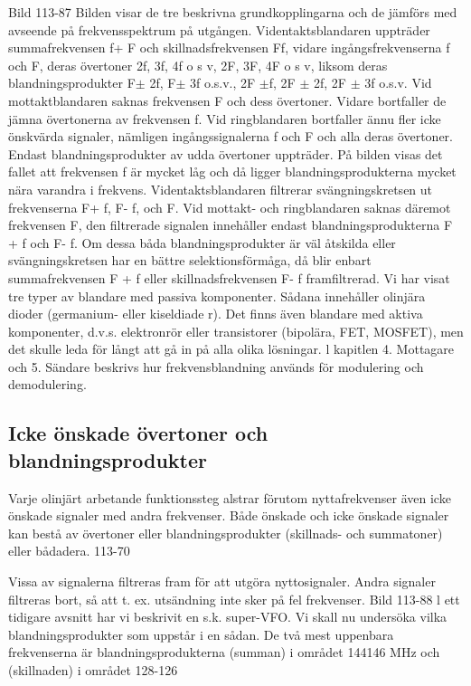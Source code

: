 Bild 113-87
Bilden visar de tre beskrivna grundkopplingarna och de jämförs med avseende på frekvensspektrum på utgången.
Videntaktsblandaren uppträder summafrekvensen f+ F och skillnadsfrekvensen Ff, vidare ingångsfrekvenserna f och F, deras
övertoner 2f, 3f, 4f o s v, 2F, 3F, 4F o s v,
liksom deras blandningsprodukter F\(\pm\) 2f, F\(\pm\)
3f o.s.v., 2F \(\pm\)f, 2F \(\pm\) 2f, 2F \(\pm\) 3f o.s.v.
Vid mottaktblandaren saknas frekvensen F och dess övertoner. Vidare bortfaller
de jämna övertonerna av frekvensen f.
Vid ringblandaren bortfaller ännu fler icke
önskvärda signaler, nämligen ingångssignalerna f och F och alla deras övertoner.
Endast blandningsprodukter av udda övertoner uppträder.
På bilden visas det fallet att frekvensen f
är mycket låg och då ligger blandningsprodukterna mycket nära varandra i frekvens.
Videntaktsblandaren filtrerar svängningskretsen ut frekvenserna F+ f, F- f, och F. Vid
mottakt- och ringblandaren saknas däremot
frekvensen F, den filtrerade signalen innehåller endast blandningsprodukterna F + f
och F- f. Om dessa båda blandningsprodukter är väl åtskilda eller svängningskretsen
har en bättre selektionsförmåga, då blir enbart summafrekvensen F + f eller skillnadsfrekvensen F- f framfiltrerad.
Vi har visat tre typer av blandare med
passiva komponenter. Sådana innehåller
olinjära dioder (germanium- eller kiseldiade r).
Det finns även blandare med aktiva komponenter, d.v.s. elektronrör eller transistorer
(bipolära, FET, MOSFET), men det skulle
leda för långt att gå in på alla olika lösningar.
l kapitlen 4. Mottagare och 5. Sändare beskrivs hur frekvensblandning används för
modulering och demodulering.

\subsection{Icke önskade övertoner och blandningsprodukter}

Varje olinjärt arbetande funktionssteg alstrar förutom nyttafrekvenser även icke önskade signaler med andra frekvenser. Både
önskade och icke önskade signaler kan bestå av övertoner eller blandningsprodukter
(skillnads- och summatoner) eller bådadera.
113-70

Vissa av signalerna filtreras fram för att
utgöra nyttosignaler. Andra signaler filtreras
bort, så att t. ex. utsändning inte sker på fel
frekvenser.
Bild 113-88
l ett tidigare avsnitt har vi beskrivit en s.k.
super-VFO. Vi skall nu undersöka vilka blandningsprodukter som uppstår i en sådan. De
två mest uppenbara frekvenserna är blandningsprodukterna (summan) i området 144146 MHz och (skillnaden) i området 128-126

